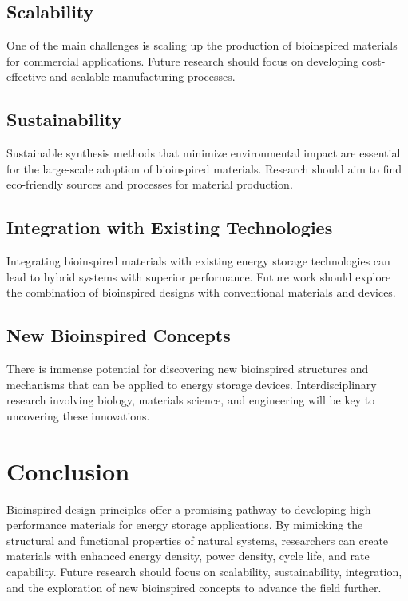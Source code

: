 \documentclass[12pt]{article}
\begin{document}
\subsection{Scalability}
One of the main challenges is scaling up the production of bioinspired materials for commercial applications. Future research should focus on developing cost-effective and scalable manufacturing processes.

\subsection{Sustainability}
Sustainable synthesis methods that minimize environmental impact are essential for the large-scale adoption of bioinspired materials. Research should aim to find eco-friendly sources and processes for material production.

\subsection{Integration with Existing Technologies}
Integrating bioinspired materials with existing energy storage technologies can lead to hybrid systems with superior performance. Future work should explore the combination of bioinspired designs with conventional materials and devices.

\subsection{New Bioinspired Concepts}
There is immense potential for discovering new bioinspired structures and mechanisms that can be applied to energy storage devices. Interdisciplinary research involving biology, materials science, and engineering will be key to uncovering these innovations.

\section{Conclusion}
Bioinspired design principles offer a promising pathway to developing high-performance materials for energy storage applications. By mimicking the structural and functional properties of natural systems, researchers can create materials with enhanced energy density, power density, cycle life, and rate capability. Future research should focus on scalability, sustainability, integration, and the exploration of new bioinspired concepts to advance the field further.



\end{document}
